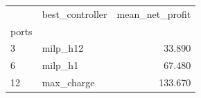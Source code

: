 \begin{tabular}{llr}
\toprule
 & best_controller & mean_net_profit \\
ports &  &  \\
\midrule
3 & milp_h12 & 33.890 \\
6 & milp_h1 & 67.480 \\
12 & max_charge & 133.670 \\
\bottomrule
\end{tabular}
